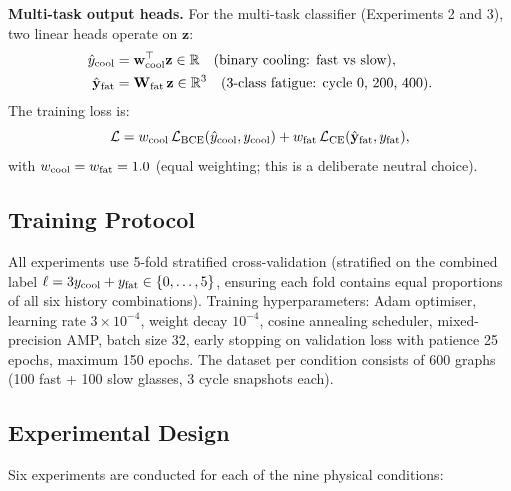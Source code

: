 \documentclass[12pt,a4paper]{article}
\begin{document}
\textbf{Multi-task output heads.}
For the multi-task classifier (Experiments 2 and 3), two linear heads operate on $\mathbf{z}$:
\begin{align}
\hat{y}_{\rm cool} &= \mathbf{w}_{\rm cool}^\top \mathbf{z} \in \mathbb{R} \quad (\text{binary cooling: fast vs slow}), \\
\hat{\mathbf{y}}_{\rm fat} &= \mathbf{W}_{\rm fat}\,\mathbf{z} \in \mathbb{R}^3 \quad (\text{3-class fatigue: cycle 0, 200, 400}).
\end{align}
The training loss is:
\begin{equation}
\mathcal{L} = w_{\rm cool}\,\mathcal{L}_{\rm BCE}(\hat{y}_{\rm cool}, y_{\rm cool}) + w_{\rm fat}\,\mathcal{L}_{\rm CE}(\hat{\mathbf{y}}_{\rm fat}, y_{\rm fat}),
\label{eq:loss}
\end{equation}
with $w_{\rm cool} = w_{\rm fat} = 1.0$ (equal weighting; this is a deliberate neutral choice).

\subsection{Training Protocol}
\label{sec:training}

All experiments use 5-fold stratified cross-validation (stratified on the combined label $\ell = 3y_{\rm cool} + y_{\rm fat} \in \{0,\ldots,5\}$, ensuring each fold contains equal proportions of all six history combinations).
Training hyperparameters: Adam optimiser, learning rate $3 \times 10^{-4}$, weight decay $10^{-4}$, cosine annealing scheduler, mixed-precision AMP, batch size 32, early stopping on validation loss with patience 25 epochs, maximum 150 epochs.
The dataset per condition consists of 600 graphs (100 fast + 100 slow glasses, 3 cycle snapshots each).

\subsection{Experimental Design}
\label{sec:expdesign}

Six experiments are conducted for each of the nine physical conditions:
\end{document}

